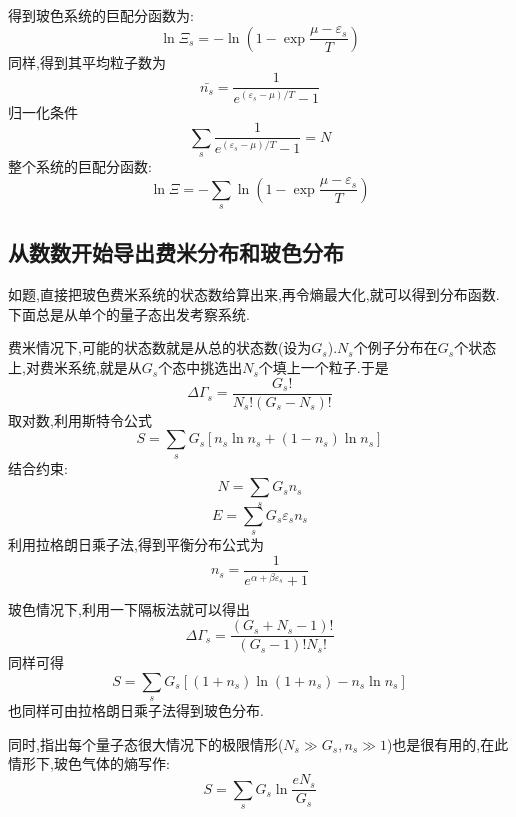     得到玻色系统的巨配分函数为:
    \begin{equation}
      \ln\Xi_s=-\ln(1-\exp\dfrac{\mu-\varepsilon_s}{T})
    \end{equation}
    同样,得到其平均粒子数为
    \begin{equation}
      \bar{n_s}=\frac{1}{e^{(\varepsilon_s -\mu) / T}-1}
    \end{equation}
    归一化条件
    \begin{equation}
      \sum_s \dfrac{1}{e^{(\varepsilon_s-\mu)/T}-1}=N
    \end{equation}
    整个系统的巨配分函数:
    \begin{equation}
      \ln\Xi=-\sum_s \ln(1-\exp\dfrac{\mu-\varepsilon_s}{T})
    \end{equation}

\subsection{从数数开始导出费米分布和玻色分布}
    如题,直接把玻色费米系统的状态数给算出来,再令熵最大化,就可以得到分布函数.下面总是从单个的量子态出发考察系统.
    
    费米情况下,可能的状态数就是从总的状态数(设为$G_s$).$N_s$个例子分布在$G_s$个状态上,对费米系统,就是从$G_s$个态中挑选出$N_s$个填上一个粒子.于是 
    \begin{equation}
      \Delta \Gamma_s=\dfrac{G_s!}{N_s!(G_s-N_s)!}
    \end{equation}
    取对数,利用斯特令公式
    \begin{equation}
      S=\sum_s G_s[n_s\ln n_s+(1-n_s)\ln n_s ]
    \end{equation}
    结合约束:
    \[N=\sum_s G_s n_s\]
    \[E= \sum_s G_s \varepsilon_s n_s\] 
    利用拉格朗日乘子法,得到平衡分布公式为
    \begin{equation}
      n_s=\frac{1}{e^{\alpha+\beta\varepsilon_s}+1}
    \end{equation}

    玻色情况下,利用一下隔板法就可以得出
    \begin{equation}
      \Delta \Gamma_s=\dfrac{(G_s+N_s-1)!}{(G_s-1)!N_s!}
    \end{equation}
    同样可得
    \begin{equation}
      S=\sum_s G_s[(1+n_s)\ln(1+n_s)-n_s \ln n_s]
    \end{equation}
    也同样可由拉格朗日乘子法得到玻色分布.

    同时,指出每个量子态很大情况下的极限情形($N_s \gg G_s, n_s \gg1$)也是很有用的,在此情形下,玻色气体的熵写作:
    \begin{equation}
      S=\sum_s G_s \ln\dfrac{e N_s}{G_s}
    \end{equation}
  
